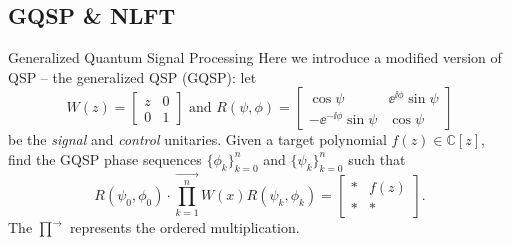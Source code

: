 \subsection{GQSP \& NLFT}
\begin{frame}{Generalized Quantum Signal Processing}
    Here we introduce a modified version of QSP -- the generalized QSP (GQSP): let
    \begin{equation}
        W(z) = \left[\begin{matrix}
            z & 0 \\ 0 & 1
        \end{matrix}\right] \text{ and } R(\psi,\phi) = \left[\begin{matrix}
            \cos\psi & \ee^{\ii\phi}\sin\psi \\ -\ee^{-\ii\phi}\sin\psi & \cos\psi
        \end{matrix}\right]
    \end{equation}
    be the \textit{signal} and \textit{control} unitaries. Given a target polynomial $f(z)\in\mathbb{C}[z]$, find the GQSP phase sequences $\{\phi_k\}_{k=0}^n$ and $\{\psi_k\}_{k=0}^n$ such that
    \begin{equation}
        R(\psi_0,\phi_0) \cdot \overrightarrow{\prod_{k=1}^n} W(x) R(\psi_k,\phi_k) = \left[\begin{matrix}
            * & f(z) \\ * & *
        \end{matrix}\right].
    \end{equation}
    The $\overrightarrow{\prod}$ represents the {\color{red}ordered multiplication}.
\end{frame}
